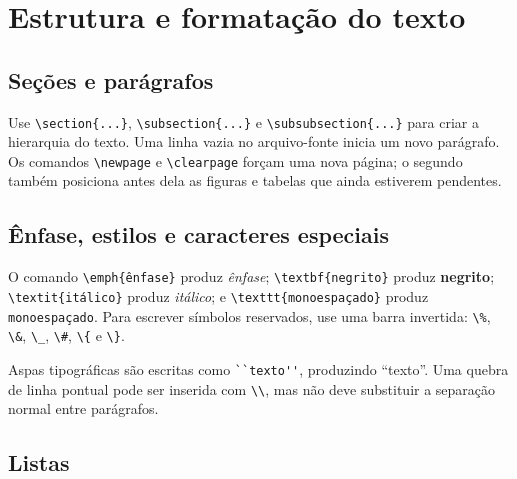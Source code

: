 \section{Estrutura e formatação do texto}\label{sec:texto}

\subsection{Seções e parágrafos}

Use \lstinline|\section{...}|, \lstinline|\subsection{...}| e \lstinline|\subsubsection{...}| para criar a hierarquia do texto. Uma linha vazia no arquivo-fonte inicia um novo parágrafo. Os comandos \lstinline|\newpage| e \lstinline|\clearpage| forçam uma nova página; o segundo também posiciona antes dela as figuras e tabelas que ainda estiverem pendentes.

\subsection{Ênfase, estilos e caracteres especiais}

O comando \texttt{\textbackslash emph\{ênfase\}} produz \emph{ênfase}; \lstinline|\textbf{negrito}| produz \textbf{negrito}; \texttt{\textbackslash textit\{itálico\}} produz \textit{itálico}; e \texttt{\textbackslash texttt\{monoespaçado\}} produz \texttt{monoespaçado}. Para escrever símbolos reservados, use uma barra invertida: \lstinline|\%|, \lstinline|\&|, \lstinline|\_|, \lstinline|\#|, \lstinline|\{| e \lstinline|\}|.

Aspas tipográficas são escritas como \lstinline|``texto''|, produzindo ``texto''. Uma quebra de linha pontual pode ser inserida com \lstinline|\\|, mas não deve substituir a separação normal entre parágrafos.

\subsection{Listas}

